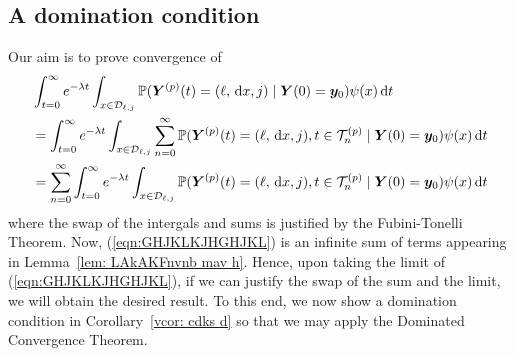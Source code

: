 \subsection{A domination condition}
Our aim is to prove convergence of 
\begin{align} 
	&\int_{t=0}^\infty e^{-\lambda t}\int_{x\in\mathcal{D}_{\ell,j}}\mathbb P({\boldsymbol Y}^{(p)}(t) = (\ell,\, \mathrm{d} x, j) \mid  \nonumber 
	\boldsymbol Y(0) = \boldsymbol y_0)\psi(x)\, \mathrm{d} t \nonumber
	\\&=\int_{t=0}^\infty e^{-\lambda t}\int_{x\in\mathcal{D}_{\ell,j}}\sum_{n=0}^\infty\mathbb P({\boldsymbol Y}^{(p)}(t) = (\ell,\, \mathrm{d} x, j), t\in\mathcal T_n^{(p)} \mid  \nonumber 
	\boldsymbol Y(0) = \boldsymbol y_0)\psi(x)\, \mathrm{d} t \nonumber
	\\&=\sum_{n=0}^\infty\int_{t=0}^\infty e^{-\lambda t}\int_{x\in\mathcal{D}_{\ell,j}}\mathbb P({\boldsymbol Y}^{(p)}(t) = (\ell,\, \mathrm{d} x, j), t\in\mathcal T_n^{(p)} \mid   
	\boldsymbol Y(0) = \boldsymbol y_0)\psi(x)\, \mathrm{d} t \label{eqn:GHJKLKJHGHJKL}
\end{align}
where the swap of the intergals and sums is justified by the Fubini-Tonelli Theorem. Now, (\ref{eqn:GHJKLKJHGHJKL}) is an infinite sum of terms appearing in Lemma~\ref{lem: LAkAKFnvnb mav h}. Hence, upon taking the limit of (\ref{eqn:GHJKLKJHGHJKL}), if we can justify the swap of the sum and the limit, we will obtain the desired result. To this end, we now show a domination condition in Corollary~\ref{vcor: cdks d} so that we may apply the Dominated Convergence Theorem. %



